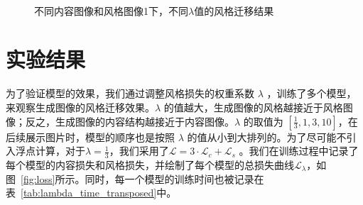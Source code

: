 \documentclass[UTF8,openany]{ctexbook}
\begin{document}
\begin{figure}[h!]
{    }
    \\
    \caption{不同内容图像和风格图像1下，不同$\lambda$值的风格迁移结果}
    \label{fig:style1}
\end{figure}

\section{实验结果}

为了验证模型的效果，我们通过调整风格损失的权重系数 $\lambda$ ，训练了多个模型，来观察生成图像的风格迁移效果。$\lambda$ 的值越大，生成图像的风格越接近于风格图像；反之，生成图像的内容结构越接近于内容图像。$\lambda$ 的取值为 $[\frac{1}{3}, 1, 3, 10]$，在后续展示图片时，模型的顺序也是按照 $\lambda$ 的值从小到大排列的。为了尽可能不引入浮点计算，对于$\lambda = \frac{1}{3}$，我们采用了$\mathcal{L} = 3 \cdot \mathcal{L}_c + \mathcal{L}_s$
。我们在训练过程中记录了每个模型的内容损失和风格损失，并绘制了每个模型的总损失曲线$\mathcal{L}_\lambda$，如图~\ref{fig:loss}所示。同时，每一个模型的训练时间也被记录在表~\ref{tab:lambda_time_transposed}中。
\end{document}
